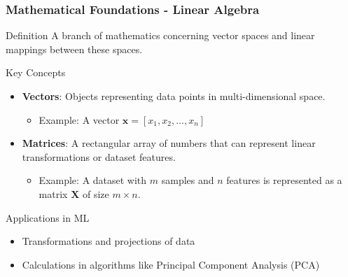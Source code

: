 \documentclass{beamer}
\begin{document}
\begin{frame}[fragile]
    \frametitle{Mathematical Foundations - Linear Algebra}
    \begin{block}{Definition}
        A branch of mathematics concerning vector spaces and linear mappings between these spaces.
    \end{block}
    
    \begin{block}{Key Concepts}
        \begin{itemize}
            \item \textbf{Vectors}: Objects representing data points in multi-dimensional space.
            \begin{itemize}
                \item Example: A vector \( \mathbf{x} = [x_1, x_2, \ldots, x_n] \)
            \end{itemize}
            \item \textbf{Matrices}: A rectangular array of numbers that can represent linear transformations or dataset features.
            \begin{itemize}
                \item Example: A dataset with \(m\) samples and \(n\) features is represented as a matrix \( \mathbf{X} \) of size \( m \times n \).
            \end{itemize}
        \end{itemize}
    \end{block}
    
    \begin{block}{Applications in ML}
        \begin{itemize}
            \item Transformations and projections of data
            \item Calculations in algorithms like Principal Component Analysis (PCA)
        \end{itemize}
    \end{block}
\end{frame}
\end{document}
